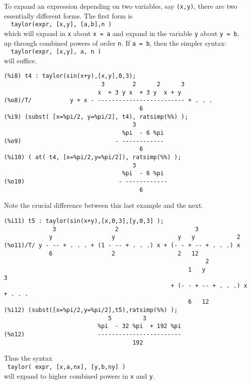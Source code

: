 \documentclass[12pt]{article}
\begin{document}
\normalsize
To expand an expression depending on two variables, say \verb|(x,y)|, there
  are two essentially different forms.
The first form is\\
\verb|  taylor(expr, [x,y], [a,b],n )|\\
  which will expand in \verb|x| about \verb|x = a|  and expand
  in the variable \verb|y| about \verb|y = b|, up through combined powers
   of order \verb|n|.
If \verb|a = b|, then the simpler syntax:\\
\verb|  taylor(expr, [x,y], a, n ) |\\
will suffice. 
\newpage
  
\small
\begin{verbatim}
(%i8) t4 : taylor(sin(x+y),[x,y],0,3);
                            3        2      2      3
                           x  + 3 y x  + 3 y  x + y
(%o8)/T/           y + x - ------------------------- + . . .
                                       6
(%i9) (subst( [x=%pi/2, y=%pi/2], t4), ratsimp(%%) );
                                     3
                                  %pi  - 6 %pi
(%o9)                           - ------------
                                       6
(%i10) ( at( t4, [x=%pi/2,y=%pi/2]), ratsimp(%%) );
                                     3
                                  %pi  - 6 %pi
(%o10)                           - ------------
                                       6
\end{verbatim}
\normalsize
Note the crucial difference between this last example and the next.
\small
\begin{verbatim}
(%i11) t5 : taylor(sin(x+y),[x,0,3],[y,0,3] );
              3                 2                      3
             y                 y                  y   y            2
(%o11)/T/ y - -- + . . . + (1 - -- + . . .) x + (- - + -- + . . .) x
             6                 2                  2   12
                                                          2
                                                     1   y            3
                                                + (- - + -- + . . .) x  + . . .
                                                     6   12
(%i12) (subst([x=%pi/2,y=%pi/2],t5),ratsimp(%%) );
                              5         3
                           %pi  - 32 %pi  + 192 %pi
(%o12)                     ------------------------
                                     192
\end{verbatim}
\normalsize
Thus the syntax\\
\verb| taylor( expr, [x,a,nx], [y,b,ny] )|\\
will expand to higher combined powers in \verb|x| and \verb|y|.
\end{document}
